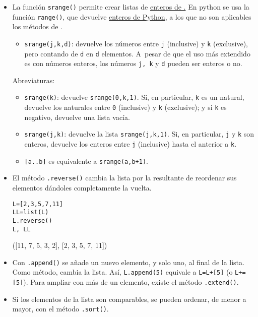 \begin{enumerate}
\begin{itemize}
\item La función \lstinline|srange()| permite crear listas de
\hyperref[enteros]{enteros de
{\sage}.}
En python se usa la función \lstinline|range()|, que devuelve
\hyperref[enteros]{enteros de Python,}
a los que
no son aplicables los métodos de {\sage}. 
\begin{itemize}
 \item \lstinline|srange(j,k,d)|: devuelve los números entre \lstinline|j|
(inclusive) y
\lstinline|k|
(exclusive), pero contando de \lstinline|d| en \lstinline|d| elementos. A~pesar
de que el
uso más extendido es con números enteros, los números \lstinline|j, k|  y
\lstinline|d|
pueden ser enteros o no.
\end{itemize}
Abreviaturas:
\begin{itemize}
 \item \lstinline|srange(k)|: devuelve \lstinline|srange(0,k,1)|. Si, en
particular,
\lstinline|k|
es un natural, devuelve los naturales entre \lstinline|0| (inclusive) y
\lstinline|k|
(exclusive); y si \lstinline|k| es
negativo, devuelve una lista vacía.
 \item \lstinline|srange(j,k)|: devuelve la lista \lstinline|srange(j,k,1)|. Si,
en
particular, \lstinline|j| y \lstinline|k| son enteros, devuelve los enteros
entre 
\lstinline|j| (inclusive) hasta el anterior a \lstinline|k|. 
\item \lstinline|[a..b]| es equivalente a  \lstinline|srange(a,b+1)|.
\end{itemize}

\item El método \lstinline|.reverse()| cambia la lista por la resultante de
reordenar sus elementos dándoles completamente la vuelta.
\begin{lstlisting}
L=[2,3,5,7,11]
LL=list(L)
L.reverse()
L, LL
\end{lstlisting}
\begin{Output}
	([11, 7, 5, 3, 2], [2, 3, 5, 7, 11])
\end{Output}

\item Con \lstinline|.append()| se añade un nuevo elemento, y solo uno, al final
de la
lista. Como método, cambia la lista. Así, \lstinline|L.append(5)| equivale a
\lstinline|L=L+[5]| (o \lstinline|L+=[5]|). Para ampliar con más de un elemento,
existe
el método \lstinline|.extend()|.

\item Si los elementos de la lista son comparables, se pueden ordenar, de menor
a mayor,
con el método \lstinline|.sort()|.


\end{itemize}
\end{enumerate}
